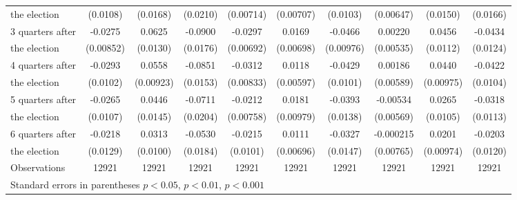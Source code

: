 \begin{table}[!ht]
\begin{tabular}{l*{9}{c}}
 the election                   &    (0.0108)         &    (0.0168)         &    (0.0210)         &   (0.00714)         &   (0.00707)         &    (0.0103)         &   (0.00647)         &    (0.0150)         &    (0.0166)         \\
[0.5em]
 3 quarters after&     -0.0275\sym{**} &      0.0625\sym{***}&     -0.0900\sym{***}&     -0.0297\sym{***}&      0.0169\sym{*}  &     -0.0466\sym{***}&     0.00220         &      0.0456\sym{***}&     -0.0434\sym{***}\\
   the election                  &   (0.00852)         &    (0.0130)         &    (0.0176)         &   (0.00692)         &   (0.00698)         &   (0.00976)         &   (0.00535)         &    (0.0112)         &    (0.0124)         \\
[0.5em]
 4 quarters after &     -0.0293\sym{**} &      0.0558\sym{***}&     -0.0851\sym{***}&     -0.0312\sym{***}&      0.0118\sym{*}  &     -0.0429\sym{***}&     0.00186         &      0.0440\sym{***}&     -0.0422\sym{***}\\
  the election                  &    (0.0102)         &   (0.00923)         &    (0.0153)         &   (0.00833)         &   (0.00597)         &    (0.0101)         &   (0.00589)         &   (0.00975)         &    (0.0104)         \\
[0.5em]
 5 quarters after&     -0.0265\sym{*}  &      0.0446\sym{**} &     -0.0711\sym{***}&     -0.0212\sym{**} &      0.0181         &     -0.0393\sym{**} &    -0.00534         &      0.0265\sym{*}  &     -0.0318\sym{**} \\
   the election                  &    (0.0107)         &    (0.0145)         &    (0.0204)         &   (0.00758)         &   (0.00979)         &    (0.0138)         &   (0.00569)         &    (0.0105)         &    (0.0113)         \\
[0.5em]
 6 quarters after&     -0.0218         &      0.0313\sym{**} &     -0.0530\sym{**} &     -0.0215\sym{*}  &      0.0111         &     -0.0327\sym{*}  &   -0.000215         &      0.0201\sym{*}  &     -0.0203         \\
   the election                  &    (0.0129)         &    (0.0100)         &    (0.0184)         &    (0.0101)         &   (0.00696)         &    (0.0147)         &   (0.00765)         &   (0.00974)         &    (0.0120)         \\
\hline
Observations        &       12921         &       12921         &       12921         &       12921         &       12921         &       12921         &       12921         &       12921         &       12921         \\
\hline\hline
\multicolumn{10}{l}{\footnotesize Standard errors in parentheses \sym{*} \(p<0.05\), \sym{**} \(p<0.01\), \sym{***} \(p<0.001\)}\\
\end{tabular}
\end{table}

